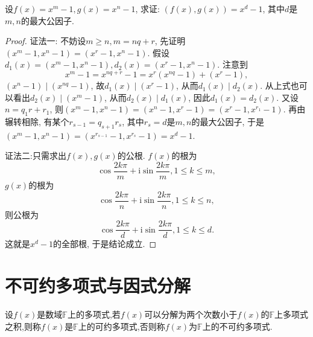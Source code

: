 \documentclass[lang=cn,newtx,10pt,scheme=chinese]{elegantbook}
\begin{document}
\begin{proposition}\label{proposition:n方差的最大公因式}
设\(f(x)=x^m - 1, g(x)=x^n - 1\), 求证: \((f(x),g(x))=x^d - 1\), 其中\(d\)是\(m,n\)的最大公因子.
\end{proposition}
\begin{proof}
{\color{blue}证法一:}
不妨设\(m\geq n, m = nq + r\), 先证明\((x^m - 1,x^n - 1)=(x^r - 1,x^n - 1)\). 假设\(d_1(x)=(x^m - 1,x^n - 1), d_2(x)=(x^r - 1,x^n - 1)\). 注意到
\[
x^m - 1=x^{nq + r}-1=x^r(x^{nq}-1)+(x^r - 1),
\]
\((x^n - 1)\mid(x^{nq}-1)\), 故\(d_1(x)\mid(x^r - 1)\), 从而\(d_1(x)\mid d_2(x)\). 从上式也可以看出\(d_2(x)\mid(x^m - 1)\), 从而\(d_2(x)\mid d_1(x)\), 因此\(d_1(x)=d_2(x)\). 又设\(n = q_1r + r_1\), 则\((x^m - 1,x^n - 1)=(x^n - 1,x^r - 1)=(x^r - 1,x^{r_1}-1)\). 再由辗转相除, 有某个\(r_{s - 1}=q_{s + 1}r_s\), 其中\(r_s = d\)是\(m,n\)的最大公因子, 于是\((x^m - 1,x^n - 1)=(x^{r_{s - 1}}-1,x^{r_s}-1)=x^d - 1\).

{\color{blue}证法二:}只需求出\(f(x),g(x)\)的公根. \(f(x)\)的根为
\[
\cos\frac{2k\pi}{m}+\mathrm{i}\sin\frac{2k\pi}{m}, 1\leq k\leq m,
\]
\(g(x)\)的根为
\[
\cos\frac{2k\pi}{n}+\mathrm{i}\sin\frac{2k\pi}{n}, 1\leq k\leq n,
\]
则公根为
\[
\cos\frac{2k\pi}{d}+\mathrm{i}\sin\frac{2k\pi}{d}, 1\leq k\leq d.
\]
这就是\(x^d - 1\)的全部根, 于是结论成立.
\end{proof}


\section{不可约多项式与因式分解}

\begin{definition}[不可约多项式的定义]\label{definition:不可约多项式的定义}
设\(f(x)\)是数域\(\mathbb{F}\)上的多项式,若\(f(x)\)可以分解为两个次数小于\(f(x)\)的\(\mathbb{F}\)上多项式之积,则称\(f(x)\)是\(\mathbb{F}\)上的可约多项式,否则称\(f(x)\)为\(\mathbb{F}\)上的不可约多项式.
\end{definition}
\end{document}

